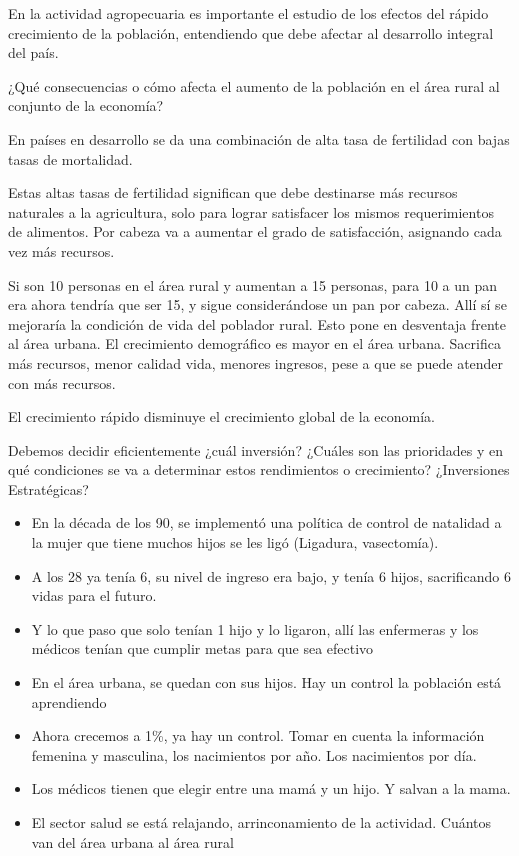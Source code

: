 \documentclass[
  a4paper,
]{article}
\begin{document}
En la actividad agropecuaria es importante el estudio de los efectos del
rápido crecimiento de la población, entendiendo que debe afectar al
desarrollo integral del país.

¿Qué consecuencias o cómo afecta el aumento de la población en el área
rural al conjunto de la economía?

En países en desarrollo se da una combinación de alta tasa de fertilidad
con bajas tasas de mortalidad.

Estas altas tasas de fertilidad significan que debe destinarse más
recursos naturales a la agricultura, solo para lograr satisfacer los
mismos requerimientos de alimentos. Por cabeza va a aumentar el grado de
satisfacción, asignando cada vez más recursos.

Si son 10 personas en el área rural y aumentan a 15 personas, para 10 a
un pan era ahora tendría que ser 15, y sigue considerándose un pan por
cabeza. Allí sí se mejoraría la condición de vida del poblador rural.
Esto pone en desventaja frente al área urbana. El crecimiento
demográfico es mayor en el área urbana. Sacrifica más recursos, menor
calidad vida, menores ingresos, pese a que se puede atender con más
recursos.

El crecimiento rápido disminuye el crecimiento global de la economía.

Debemos decidir eficientemente ¿cuál inversión? ¿Cuáles son las
prioridades y en qué condiciones se va a determinar estos rendimientos o
crecimiento? ¿Inversiones Estratégicas?

\begin{itemize}
\item
  En la década de los 90, se implementó una política de control de
  natalidad a la mujer que tiene muchos hijos se les ligó (Ligadura,
  vasectomía).
\item
  A los 28 ya tenía 6, su nivel de ingreso era bajo, y tenía 6 hijos,
  sacrificando 6 vidas para el futuro.
\item
  Y lo que paso que solo tenían 1 hijo y lo ligaron, allí las enfermeras
  y los médicos tenían que cumplir metas para que sea efectivo
\item
  En el área urbana, se quedan con sus hijos. Hay un control la
  población está aprendiendo
\item
  Ahora crecemos a 1\%, ya hay un control. Tomar en cuenta la
  información femenina y masculina, los nacimientos por año. Los
  nacimientos por día.
\item
  Los médicos tienen que elegir entre una mamá y un hijo. Y salvan a la
  mama.
\item
  El sector salud se está relajando, arrinconamiento de la actividad.
  Cuántos van del área urbana al área rural
\end{itemize}
\end{document}
